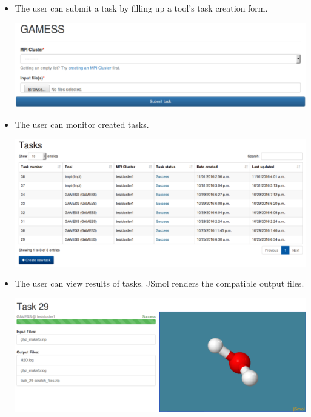 \begin{itemize}
		\item The user can submit a task by filling up a tool's task creation form. \newline
		\begin{center}			
			\includegraphics[scale=0.40]{./images/gamess_form_2.png}			
		\end{center}	
		
		\item The user can monitor created tasks. \newline
		\begin{center}			
			\includegraphics[scale=0.40]{./images/tasks_list_view_2.png}			
		\end{center}	
		\item The user can view results of tasks. JSmol renders the compatible output files\cite{IJCH:IJCH201300024}. \newline
		\begin{center}			
			\includegraphics[scale=0.35]{./images/jsmol_detail_view_2.png}			
		\end{center}	

		    
		
	\end{itemize}
	
